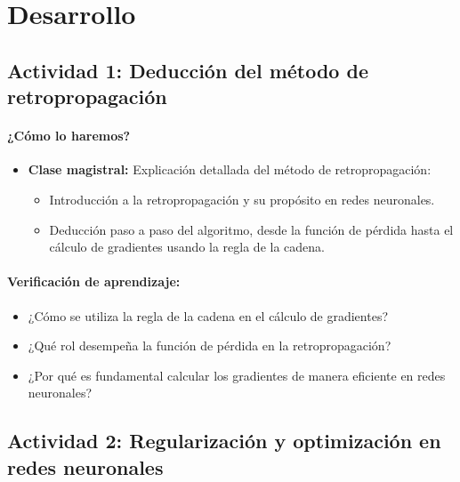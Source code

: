 \documentclass[a4,11pt]{aleph-notas}
\begin{document}
\section*{Desarrollo}  

\subsection*{Actividad 1: Deducción del método de retropropagación}  

\paragraph{¿Cómo lo haremos?}  
\begin{itemize}[leftmargin=*]  
    \item \textbf{Clase magistral:}  
    Explicación detallada del método de retropropagación:
    \begin{itemize}[leftmargin=*]
        \item Introducción a la retropropagación y su propósito en redes neuronales.
        \item Deducción paso a paso del algoritmo, desde la función de pérdida hasta el cálculo de gradientes usando la regla de la cadena.
    \end{itemize}  
\end{itemize}  

\paragraph{Verificación de aprendizaje:}  
\begin{itemize}[leftmargin=*]  
    \item ¿Cómo se utiliza la regla de la cadena en el cálculo de gradientes?  
    \item ¿Qué rol desempeña la función de pérdida en la retropropagación?  
    \item ¿Por qué es fundamental calcular los gradientes de manera eficiente en redes neuronales?  
\end{itemize}  

\subsection*{Actividad 2: Regularización y optimización en redes neuronales}  
\end{document}
